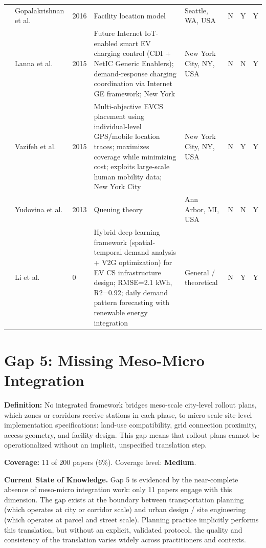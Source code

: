 \documentclass[letterpaper, 12pt, oneside, doublespacing]{Thesis}
\begin{document}
\begin{longtable}{L{0.9cm} L{1.8cm} L{0.7cm} L{2.5cm} L{2.1cm} L{0.7cm} L{0.7cm} L{0.7cm}}
\cite{demand_prediction_2016} & Gopalakrishnan et al. & 2016 & Facility location model & Seattle, WA, USA & N & Y & Y \\
\cite{electric_vehicles_2015} & Lanna et al. & 2015 & Future Internet IoT-enabled smart EV charging control (CDI + NetIC Generic Enablers); demand-response charging coordination via Internet GE framework; New York & New York City, NY, USA & N & N & Y \\
\cite{optimizing_the_2015} & Vazifeh et al. & 2015 & Multi-objective EVCS placement using individual-level GPS/mobile location traces; maximizes coverage while minimizing cost; exploits large-scale human mobility data; New York City & New York City, NY, USA & N & Y & Y \\
\cite{socially_optimal_2013} & Yudovina et al. & 2013 & Queuing theory & Ann Arbor, MI, USA & N & N & Y \\
\cite{electric_vehicle_0} & Li et al. & 0 & Hybrid deep learning framework (spatial-temporal demand analysis + V2G optimization) for EV CS infrastructure design; RMSE=2.1 kWh, R2=0.92; daily demand pattern forecasting with renewable energy integration & General {\slash} theoretical & N & Y & Y \\
\bottomrule
\end{longtable}


\section{Gap 5: Missing Meso-Micro Integration}


\noindent \textbf{Definition:} No integrated framework bridges meso-scale city-level rollout plans, which zones or corridors receive stations in each phase, to micro-scale site-level implementation specifications: land-use compatibility, grid connection proximity, access geometry, and facility design. This gap means that rollout plans cannot be operationalized without an implicit, unspecified translation step.



\noindent \textbf{Coverage:} 11 of 200 papers (6\%). Coverage level: \textbf{Medium}.



\noindent \textbf{Current State of Knowledge.} Gap 5 is evidenced by the near-complete absence of meso-micro integration work: only 11 papers engage with this dimension. The gap exists at the boundary between transportation planning (which operates at city or corridor scale) and urban design / site engineering (which operates at parcel and street scale). Planning practice implicitly performs this translation, but without an explicit, validated protocol, the quality and consistency of the translation varies widely across practitioners and contexts.
\end{document}
